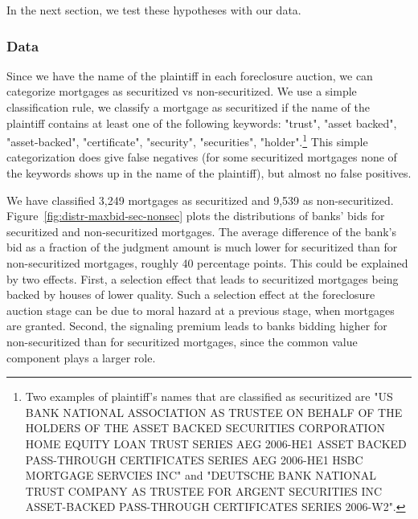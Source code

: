\documentclass[11pt,twopage]{article}
\begin{document}
In the next section, we test these hypotheses with our data.

%

\subsubsection{Data}

Since we have the name of the plaintiff in each foreclosure auction,
we can categorize mortgages as securitized vs non-securitized. We use
a simple classification rule, we classify a mortgage as securitized if
the name of the plaintiff contains at least one of the following
keywords: "trust", "asset backed", "asset-backed",
"certificate", "security", "securities", "holder".\footnote{Two examples of plaintiff's names that are classified as securitized are "US BANK NATIONAL ASSOCIATION AS TRUSTEE ON BEHALF OF THE HOLDERS OF THE ASSET BACKED SECURITIES CORPORATION HOME EQUITY LOAN TRUST SERIES AEG 2006-HE1 ASSET BACKED PASS-THROUGH CERTIFICATES SERIES AEG 2006-HE1
	HSBC MORTGAGE SERVCIES INC" and "DEUTSCHE BANK NATIONAL TRUST COMPANY AS TRUSTEE FOR ARGENT SECURITIES INC ASSET-BACKED PASS-THROUGH CERTIFICATES SERIES 2006-W2".} This simple
categorization does give false negatives (for some securitized
mortgages none of the keywords shows up in the name of the plaintiff),
but almost no false positives.

We have classified 3,249 mortgages as securitized and 9,539 as non-securitized. Figure~\ref{fig:distr-maxbid-sec-nonsec} plots the distributions of banks' bids for securitized and non-securitized mortgages. The average difference of the bank's bid as a fraction of the judgment amount is much lower for securitized than for non-securitized mortgages, roughly 40 percentage points. This could be explained by two effects. First, a selection
effect that leads to securitized mortgages being backed by houses of
lower quality. Such a selection effect at the foreclosure auction
stage can be due to moral hazard at a previous stage, when mortgages
are granted. Second, the signaling premium leads to banks bidding
higher for non-securitized than for securitized mortgages, since the
common value component plays a larger role.
\end{document}
